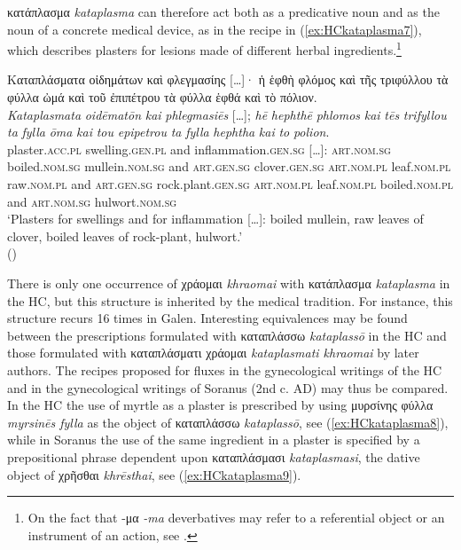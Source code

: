 \documentclass[output=paper,colorlinks,citecolor=brown]{langscibook}
\begin{document}
κατάπλασμα \textit{kataplasma} can therefore act both as a predicative noun and as the noun of a concrete medical device, as in the recipe in (\ref{ex:HCkataplasma7}), which describes plasters for lesions made of different herbal ingredients.\footnote{On the fact that -μα \textit{-ma} deverbatives may refer to a referential object or an instrument of an action, see \citet[ 159--168]{Civilleri2012}.}

\begin{exe}
\ex\label{ex:HCkataplasma7}
\glll Καταπλάσματα οἰδημάτων καὶ φλεγμασίης […]· ἡ ἑφθὴ φλόμος καὶ τῆς τριφύλλου τὰ φύλλα ὠμά καὶ τοῦ ἐπιπέτρου τὰ φύλλα ἑφθά καὶ τὸ πόλιον. \\ 
\textit{Kataplasmata} \textit{oidēmatōn} \textit{kai} \textit{phlegmasiēs} […]; \textit{hē} \textit{hephthē} \textit{phlomos} \textit{kai} \textit{tēs} \textit{trifyllou} \textit{ta} \textit{fylla} \textit{ōma} \textit{kai} \textit{tou} \textit{epipetrou} \textit{ta} \textit{fylla} \textit{hephtha} \textit{kai} \textit{to} \textit{polion}. \\
plaster.\textsc{acc.pl} swelling.\textsc{gen.pl} and inflammation.\textsc{gen.sg} […]: \textsc{art.nom.sg} boiled.\textsc{nom.sg} mullein.\textsc{nom.sg} and \textsc{art.gen.sg} clover.\textsc{gen.sg} \textsc{art.nom.pl} leaf.\textsc{nom.pl} raw.\textsc{nom.pl} and \textsc{art.gen.sg} rock.plant.\textsc{gen.sg} \textsc{art.nom.pl} leaf.\textsc{nom.pl} boiled.\textsc{nom.pl} and \textsc{art.nom.sg} hulwort.\textsc{nom.sg}\\
\glt ‘Plasters for swellings and for inflammation […]: boiled mullein, raw leaves of clover, boiled leaves of rock-plant, hulwort.' \\
\hspace*{\fill}()
\end{exe}

There is only one occurrence of χράομαι \textit{khraomai} with κατάπλασμα \textit{kataplasma} in the HC, but this structure is inherited by the medical tradition. For instance, this structure recurs 16 times in Galen. Interesting equivalences may be found between the prescriptions formulated with καταπλάσσω \textit{kataplassō} in the HC and those formulated with καταπλάσματι χράομαι \textit{kataplasmati khraomai} by later authors. The recipes proposed for fluxes in the gynecological writings of the HC and in the gynecological writings of Soranus (2nd c. AD) may thus be compared. In the HC the use of myrtle as a plaster is prescribed by using μυρσίνης φύλλα \textit{myrsinēs fylla} as the object of καταπλάσσω \textit{kataplassō}, see (\ref{ex:HCkataplasma8}), while in Soranus the use of the same ingredient in a plaster is specified by a prepositional phrase dependent upon καταπλάσμασι \textit{kataplasmasi}, the dative object of χρῆσθαι \textit{khrēsthai}, see (\ref{ex:HCkataplasma9}). 
\end{document}
